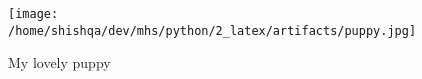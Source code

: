 \documentclass{article}
\begin{document}
\begin{figure}
	\texttt{[image: /home/shishqa/dev/mhs/python/2\_latex/artifacts/puppy.jpg]}
	\centering
	\caption{My lovely puppy}
\end{figure}
\end{document}
